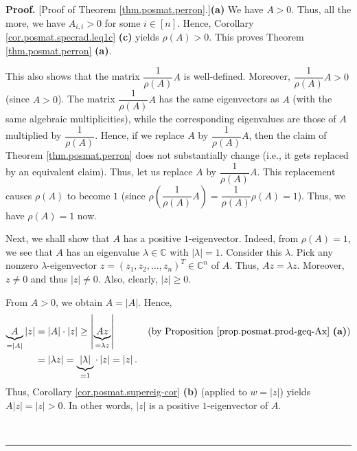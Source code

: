 \documentclass[numbers=enddot,12pt,final,onecolumn,notitlepage]{scrartcl}%
\numberwithin{exer}{subsection}
\theoremstyle{definition}
\newenvironment{proof}[1][Proof]{\noindent\textbf{#1.} }{\ \rule{0.5em}{0.5em}}
\begin{document}
\begin{proof}
[Proof of Theorem \ref{thm.posmat.perron}.]\textbf{(a)} We have $A>0$. Thus,
all the more, we have $A_{i,i}>0$ for some $i\in\left[  n\right]  $. Hence,
Corollary \ref{cor.posmat.specrad.leq1c} \textbf{(c)} yields $\rho\left(
A\right)  >0$. This proves Theorem \ref{thm.posmat.perron} \textbf{(a)}.

This also shows that the matrix $\dfrac{1}{\rho\left(  A\right)  }A$ is
well-defined. Moreover, $\dfrac{1}{\rho\left(  A\right)  }A>0$ (since $A>0$).
The matrix $\dfrac{1}{\rho\left(  A\right)  }A$ has the same eigenvectors as
$A$ (with the same algebraic multiplicities), while the corresponding
eigenvalues are those of $A$ multiplied by $\dfrac{1}{\rho\left(  A\right)  }%
$. Hence, if we replace $A$ by $\dfrac{1}{\rho\left(  A\right)  }A$, then the
claim of Theorem \ref{thm.posmat.perron} does not substantially change (i.e.,
it gets replaced by an equivalent claim). Thus, let us replace $A$ by
$\dfrac{1}{\rho\left(  A\right)  }A$. This replacement causes $\rho\left(
A\right)  $ to become $1$ (since $\rho\left(  \dfrac{1}{\rho\left(  A\right)
}A\right)  =\dfrac{1}{\rho\left(  A\right)  }\rho\left(  A\right)  =1$). Thus,
we have $\rho\left(  A\right)  =1$ now.

Next, we shall show that $A$ has a positive $1$-eigenvector. Indeed, from
$\rho\left(  A\right)  =1$, we see that $A$ has an eigenvalue $\lambda
\in\mathbb{C}$ with $\left\vert \lambda\right\vert =1$. Consider this
$\lambda$. Pick any nonzero $\lambda$-eigenvector $z=\left(  z_{1}%
,z_{2},\ldots,z_{n}\right)  ^{T}\in\mathbb{C}^{n}$ of $A$. Thus, $Az=\lambda
z$. Moreover, $z\neq0$ and thus $\left\vert z\right\vert \neq0$. Also,
clearly, $\left\vert z\right\vert \geq0$.

From $A>0$, we obtain $A=\left\vert A\right\vert $. Hence,%
\begin{align*}
\underbrace{A}_{=\left\vert A\right\vert }\left\vert z\right\vert  &
=\left\vert A\right\vert \cdot\left\vert z\right\vert \geq\left\vert
\underbrace{Az}_{=\lambda z}\right\vert \ \ \ \ \ \ \ \ \ \ \left(  \text{by
Proposition \ref{prop.posmat.prod-geq-Ax} \textbf{(a)}}\right) \\
&  =\left\vert \lambda z\right\vert =\underbrace{\left\vert \lambda\right\vert
}_{=1}\cdot\left\vert z\right\vert =\left\vert z\right\vert .
\end{align*}
Thus, Corollary \ref{cor.posmat.supereig-cor} \textbf{(b)} (applied to
$w=\left\vert z\right\vert $) yields $A\left\vert z\right\vert =\left\vert
z\right\vert >0$. In other words, $\left\vert z\right\vert $ is a positive
$1$-eigenvector of $A$.


\end{proof}
\end{document}
